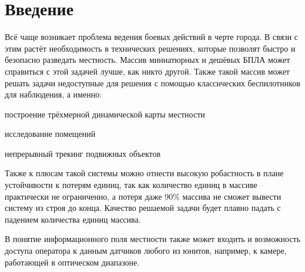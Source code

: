\section{Введение}

Всё чаще возникает проблема ведения боевых действий
в черте города. В связи с этим растёт необходимость в технических
решениях, которые позволят быстро и безопасно разведать местность.
Массив миниатюрных и дешёвых БПЛА может справиться с этой задачей 
лучше, как никто другой. Также такой массив может решать задачи недоступные
для решения с помощью классических беспилотников для наблюдения, а именно: 
\begin{mintemize}
    \item построение трёхмерной динамической карты местности
    \item исследование помещений
    \item непрерывный трекинг подвижных объектов
\end{mintemize}

Также к плюсам такой системы можно отнести высокую робастность в плане
устойчивости к потерям единиц, так как количество единиц в массиве
практически не ограниченно, а потеря даже 90\% массива не сможет
вывести систему из строя до конца. Качество решаемой задачи
будет плавно падать с падением количества единиц массива.

В понятие информационного поля местности также может входить
и возможность доступа оператора к данным датчиков любого из юнитов, например,
к камере, работающей в оптическом диапазоне.
